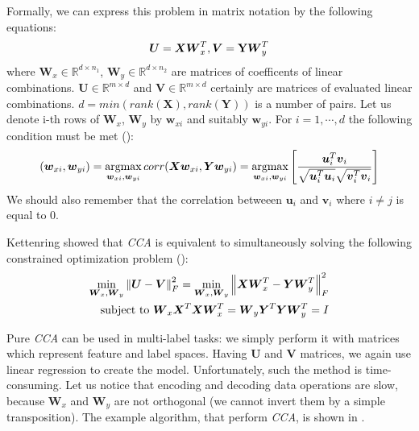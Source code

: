 Formally, we can express this problem in matrix notation by the following equations:
\begin{equation}\label{eq:cca1}
    \boldsymbol{U}=\boldsymbol{X}\boldsymbol{W}_x^T,   \boldsymbol{V}=\bold{Y}\boldsymbol{W}_y^T    
\end{equation}
where $\boldsymbol{W}_x \in \mathbb{R}^{d \times n_1}$, $\boldsymbol{W}_y \in \mathbb{R}^{d \times n_2}$ are matrices of coefficents of linear combinations. $\boldsymbol{U} \in \mathbb{R}^{m \times d}$ and $\boldsymbol{V} \in \mathbb{R}^{m \times d}$ certainly are matrices of evaluated linear combinations. $d=min(rank(\boldsymbol{X}), rank(\boldsymbol{Y}))$ is a number of pairs. Let us denote i-th rows of $\boldsymbol{W}_x$, $\boldsymbol{W}_y$ by $\boldsymbol{w}_{xi}$ and suitably $\boldsymbol{w}_{yi}$. For $i=1,\cdots,d$ the following condition must be met (\cite{William}):
\begin{equation}\label{eq:cca2}
    (\boldsymbol{w}_{xi}, \boldsymbol{w}_{yi})=\operatorname*{argmax}_{\boldsymbol{w}_{xi}, \boldsymbol{w}_{yi}} corr(\boldsymbol{X}\boldsymbol{w}_{xi}, \boldsymbol{Y}\boldsymbol{w}_{yi}) = \operatorname*{argmax}_{\boldsymbol{w}_{xi}, \boldsymbol{w}_{yi}} \left[\frac{\boldsymbol{u}^{T}_i\boldsymbol{v}_i}{\sqrt{\boldsymbol{u}^T_i\boldsymbol{u}_i}\sqrt{\boldsymbol{v}^{T}_i\boldsymbol{v}_i}}\right] 
\end{equation}
We should also remember that the correlation betweeen $\boldsymbol{u}_i$ and $\boldsymbol{v}_i$ where $i\neq j$ is equal to $0$.

Kettenring showed that \textit{CCA} is equivalent to simultaneously solving the following constrained optimization problem (\cite{ChenLin}):
\begin{equation}\label{eq:cca3}
\begin{split}
    \min_{\boldsymbol{W}_x, \boldsymbol{W}_y} \left\lVert\boldsymbol{U}-\boldsymbol{V}\right\rVert_{F}^2 = \min_{\boldsymbol{W}_x, \boldsymbol{W}_y} \left\lVert\boldsymbol{X}\boldsymbol{W}_x^T-\boldsymbol{Y}\boldsymbol{W}_y^T\right\rVert_{F}^2 \\ 
    \text{   subject to   } \boldsymbol{W}_x\boldsymbol{X}^T\boldsymbol{X}\boldsymbol{W}_x^T=\boldsymbol{W}_y\boldsymbol{Y}^T\boldsymbol{Y}\boldsymbol{W}_y^T=I   
\end{split}
\end{equation}

Pure \textit{CCA} can be used in multi-label tasks: we simply perform it with matrices which represent feature and label spaces. Having $\boldsymbol{U}$ and $\boldsymbol{V}$ matrices, we again use linear regression to create the model. Unfortunately, such the method is time-consuming. Let us notice that encoding and decoding data operations are slow, because $\boldsymbol{W}_x$ and $\boldsymbol{W}_y$ are not orthogonal (we cannot invert them by a simple transposition). The example algorithm, that perform \textit{CCA}, is shown in . 

